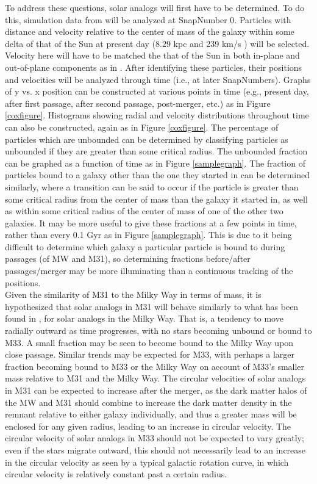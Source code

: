\documentclass{aastex63}
\begin{document}
To address these questions, solar analogs will first have to be determined. To do this, simulation data from \cite{van12} will be analyzed at SnapNumber 0. Particles with distance and velocity relative to the center of mass of the galaxy within some delta of that of the Sun at present day (8.29 kpc and 239 km/s \citep{van12}) will be selected. Velocity here will have to be matched the that of the Sun in both in-plane and out-of-plane components as in \cite{van12}. After identifying these particles, their positions and velocities will be analyzed through time (i.e., at later SnapNumbers). Graphs of y vs. x position can be constructed at various points in time (e.g., present day, after first passage, after second passage, post-merger, etc.) as in Figure \ref{coxfigure}. Histograms showing radial and velocity distributions throughout time can also be constructed, again as in Figure \ref{coxfigure}. The percentage of particles which are unbounded can be determined by classifying particles as unbounded if they are greater than some critical radius. The unbounded fraction can be graphed as a function of time as in Figure \ref{samplegraph}. The fraction of particles bound to a galaxy other than the one they started in can be determined similarly, where a transition can be said to occur if the particle is greater than some critical radius from the center of mass than the galaxy it started in, as well as within some critical radius of the center of mass of one of the other two galaxies. It may be more useful to give these fractions at a few points in time, rather than every 0.1 Gyr as in Figure \ref{samplegraph}. This is due to it being difficult to determine which galaxy a particular particle is bound to during passages (of MW and M31), so determining fractions before/after passages/merger may be more illuminating than a continuous tracking of the positions.\\
\indent Given the similarity of M31 to the Milky Way in terms of mass, it is hypothesized that solar analogs in M31 will behave similarly to what has been found in \cite{cox08}, \cite{van12} for solar analogs in the Milky Way. That is, a tendency to move radially outward as time progresses, with no stars becoming unbound or bound to M33. A small fraction may be seen to become bound to the Milky Way upon close passage. Similar trends may be expected for M33, with perhaps a larger fraction becoming bound to M33 or the Milky Way on account of M33's smaller mass relative to M31 and the Milky Way. The circular velocities of solar analogs in M31 can be expected to increase after the merger, as the dark matter halos of the MW and M31 should combine to increase the dark matter density in the remnant relative to either galaxy individually, and thus a greater mass will be enclosed for any given radius, leading to an increase in circular velocity. The circular velocity of solar analogs in M33 should not be expected to vary greatly; even if the stars migrate outward, this should not necessarily lead to an increase in the circular velocity as seen by a typical galactic rotation curve, in which circular velocity is relatively constant past a certain radius. 
\end{document}
